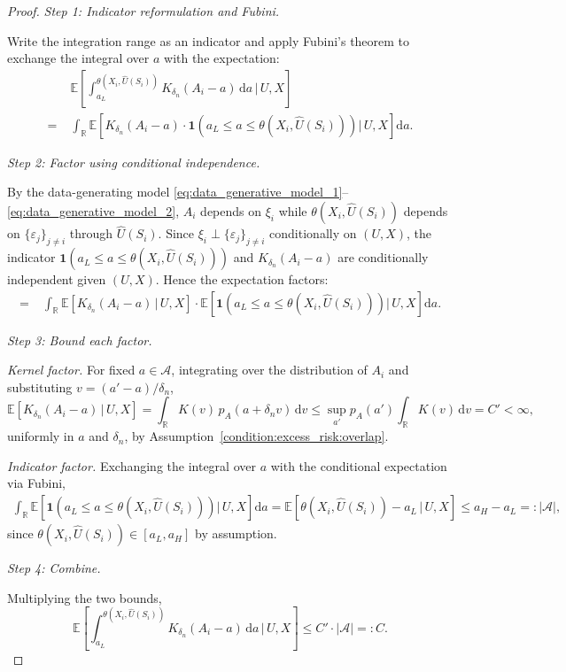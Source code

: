 \documentclass[12pt]{article}
\newcommand{\E}{\mathbb{E}}
\newcommand{\R}{\mathbb{R}}
\begin{document}
\begin{proof}
\noindent\textit{Step 1: Indicator reformulation and Fubini.}

Write the integration range as an indicator and apply Fubini's theorem to exchange the integral over $a$ with the expectation:
\begin{align*}
&\E\!\left[\int_{a_L}^{\theta(X_i,\widehat{U}(S_i))} K_{\delta_n}(A_i-a)\,\mathrm{d}a\,\bigg|\,U,X\right]\\
=\;&\int_{\R}\E\!\left[K_{\delta_n}(A_i-a)\cdot\mathbf{1}\!\left(a_L\leq a\leq \theta(X_i,\widehat{U}(S_i))\right)\Big|\,U,X\right]\mathrm{d}a.
\end{align*}

\noindent\textit{Step 2: Factor using conditional independence.}

By the data-generating model \eqref{eq:data_generative_model_1}--\eqref{eq:data_generative_model_2}, $A_i$ depends on $\xi_i$ while $\theta(X_i,\widehat{U}(S_i))$ depends on $\{\varepsilon_j\}_{j\neq i}$ through $\widehat{U}(S_i)$.  Since $\xi_i\perp\{\varepsilon_j\}_{j\neq i}$ conditionally on $(U,X)$, the indicator $\mathbf{1}(a_L\leq a\leq \theta(X_i,\widehat{U}(S_i)))$ and $K_{\delta_n}(A_i-a)$ are conditionally independent given $(U,X)$.  Hence the expectation factors:
\begin{align*}
=\;&\int_{\R}\E\!\left[K_{\delta_n}(A_i-a)\,\big|\,U,X\right]\cdot\E\!\left[\mathbf{1}\!\left(a_L\leq a\leq \theta(X_i,\widehat{U}(S_i))\right)\Big|\,U,X\right]\mathrm{d}a.
\end{align*}

\noindent\textit{Step 3: Bound each factor.}

\emph{Kernel factor.} For fixed $a\in\mathcal{A}$, integrating over the distribution of $A_i$ and substituting $v=(a'-a)/\delta_n$,
$$\E\!\left[K_{\delta_n}(A_i-a)\,\big|\,U,X\right] = \int_{\R}K(v)\,p_A(a+\delta_n v)\,\mathrm{d}v \leq \sup_{a'}p_A(a')\int_{\R}K(v)\,\mathrm{d}v = C' < \infty,$$
uniformly in $a$ and $\delta_n$, by Assumption~\ref{condition:excess_risk:overlap}.

\emph{Indicator factor.} Exchanging the integral over $a$ with the conditional expectation via Fubini,
\begin{align*}
\int_{\R}\E\!\left[\mathbf{1}\!\left(a_L\leq a\leq \theta(X_i,\widehat{U}(S_i))\right)\Big|\,U,X\right]\mathrm{d}a
= \E\!\left[\theta(X_i,\widehat{U}(S_i))-a_L\,\big|\,U,X\right]
\leq a_H - a_L =: |\mathcal{A}|,
\end{align*}
since $\theta(X_i,\widehat{U}(S_i))\in[a_L,a_H]$ by assumption.

\noindent\textit{Step 4: Combine.}

Multiplying the two bounds,
$$\E\!\left[\int_{a_L}^{\theta(X_i,\widehat{U}(S_i))} K_{\delta_n}(A_i-a)\,\mathrm{d}a\,\bigg|\,U,X\right] \leq C'\cdot|\mathcal{A}| =: C.$$
\end{proof}
\end{document}
